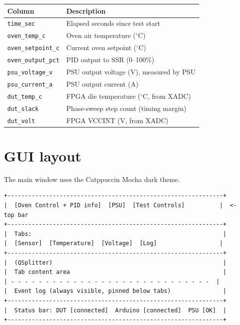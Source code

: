 \documentclass[12pt, a4paper]{report}
\begin{document}
\begin{longtable}{@{}ll@{}}
  \toprule
  \textbf{Column} & \textbf{Description} \\
  \midrule
  \endhead
  \texttt{time\_sec}       & Elapsed seconds since test start \\
  \texttt{oven\_temp\_c}   & Oven air temperature ($^\circ$C) \\
  \texttt{oven\_setpoint\_c} & Current oven setpoint ($^\circ$C) \\
  \texttt{oven\_output\_pct} & PID output to SSR (0--100\%) \\
  \texttt{psu\_voltage\_v} & PSU output voltage (V), measured by PSU \\
  \texttt{psu\_current\_a} & PSU output current (A) \\
  \texttt{dut\_temp\_c}    & FPGA die temperature ($^\circ$C, from XADC) \\
  \texttt{dut\_slack}      & Phase-sweep step count (timing margin) \\
  \texttt{dut\_volt}       & FPGA VCCINT (V, from XADC) \\
  \bottomrule
\end{longtable}

\section{GUI layout}

The main window uses the Catppuccin Mocha dark theme.

\begin{lstlisting}[style=shell, caption={Window layout}]
+--------------------------------------------------------------+
|  [Oven Control + PID info]  [PSU]  [Test Controls]          |  <- top bar
+--------------------------------------------------------------+
|  Tabs:                                                       |
|  [Sensor]  [Temperature]  [Voltage]  [Log]                  |
+--------------------------------------------------------------+
|  (QSplitter)                                                 |
|  Tab content area                                            |
| - - - - - - - - - - - - - - - - - - - - - - - - - - - - -  |
|  Event log (always visible, pinned below tabs)               |
+--------------------------------------------------------------+
|  Status bar: DUT [connected]  Arduino [connected]  PSU [OK]  |
+--------------------------------------------------------------+
\end{lstlisting}
\end{document}
